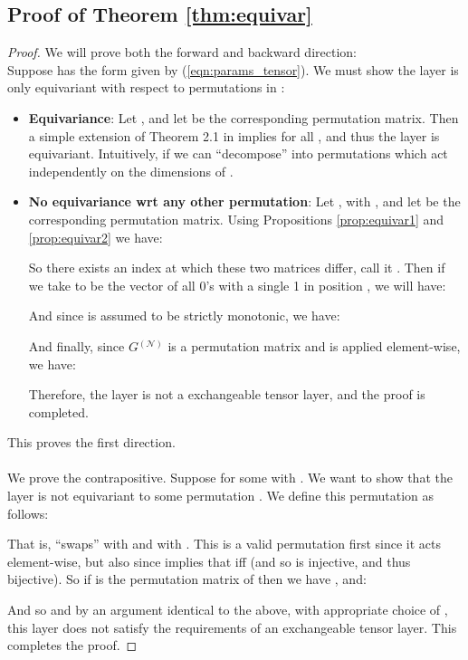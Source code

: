 \documentclass{article}
\newcommand{\mat}[1]{\ensuremath{{#1}}}
\newcommand{\pN}[0]{\ensuremath{\mathscr{N}}}
\newcommand{\prm}[1]{\ensuremath{^{(#1)}}}
\theoremstyle{definition}
\newtheorem*{proof}{Proof}\newcommand{\fix}{\marginpar{FIX}}
\begin{document}
\subsection{Proof of Theorem \ref{thm:equivar}}
\begin{proof}
  We will prove both the forward and backward direction: \\
   Suppose  has the form given by (\ref{eqn:params_tensor}). We must show the layer is only equivariant with respect to permutations in : 
  \begin{itemize}
    \item \textbf{Equivariance}: Let , and let  be the corresponding permutation matrix. Then a simple extension of Theorem 2.1 in \citep{ravanbakhsh_symmetry} implies  for all , and thus the layer is equivariant. Intuitively, if  we can ``decompose''   into  permutations  which act independently on the  dimensions of . 
    \item \textbf{No equivariance wrt any other permutation}: Let , with , and let  be the corresponding permutation matrix.
    Using Propositions \ref{prop:equivar1} and \ref{prop:equivar2} we have:
   
  So there exists an index at which these two matrices differ, call it . Then if we take  to be the vector of all 0's with a single 1 in position , we will have:
     
   And since  is assumed to be strictly monotonic, we have:
     
   And finally, since \mat{G}\prm{\pN} is a permutation matrix and  is applied element-wise, we have:
        
   Therefore, the layer  is not a exchangeable tensor layer, and the proof is completed.
   \end{itemize}
  This proves the first direction. \\
  \\
   We prove the contrapositive.  Suppose  for some  with . We want to show that the layer  is not equivariant to some permutation . We define this permutation as follows: 
   
  That is,  ``swaps''  with  and  with . This is a valid permutation first since it acts element-wise, but also since  implies that  iff  (and so  is injective, and thus bijective). So if  is the permutation matrix of  then we have , and:
  

  And so  and by an argument identical to the above, with appropriate choice of , this layer does not satisfy the requirements of an exchangeable tensor layer. This completes the proof. 
\end{proof}
\end{document}

